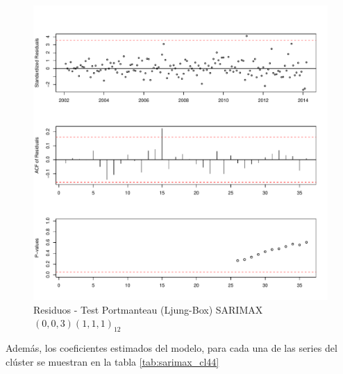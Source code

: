 \documentclass[12pt,oneside]{book}\usepackage[]{graphicx}\usepackage[]{color}
\makeatletter
\def\maxwidth{ %
  \ifdim\Gin@nat@width>\linewidth
    \linewidth
  \else
    \Gin@nat@width
  \fi
}
\newenvironment{knitrout}{}{} %
\theoremstyle{definition} %
\makeatother
\begin{document}
\begin{knitrout}
\color{fgcolor}\begin{figure}[h]

{\centering \includegraphics[width=\maxwidth]{figure/unnamed-chunk-116-1} 

}

\caption[Residuos - Test Portmanteau (Ljung-Box) SARIMAX$(0,0,3)(1,1,1)_{12}$]{Residuos - Test Portmanteau (Ljung-Box) SARIMAX$(0,0,3)(1,1,1)_{12}$}\label{fig:unnamed-chunk-116}
\end{figure}


\end{knitrout}


Además, los coeficientes estimados del modelo, para cada una de las series del clúster se muestran en la tabla \ref{tab:sarimax_cl44}
\end{document}
